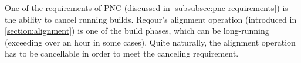 \documentclass[../main.tex]{subfiles}
\begin{document}
One of the requirements of PNC (discussed in \ref{subsubsec:pnc-requirements}) is the ability to cancel running builds. Reqour's alignment operation (introduced in \ref{section:alignment}) is one of the build phases, which can be long-running (exceeding over an hour in some cases). Quite naturally, the alignment operation has to be cancellable in order to meet the canceling requirement.
\end{document}

